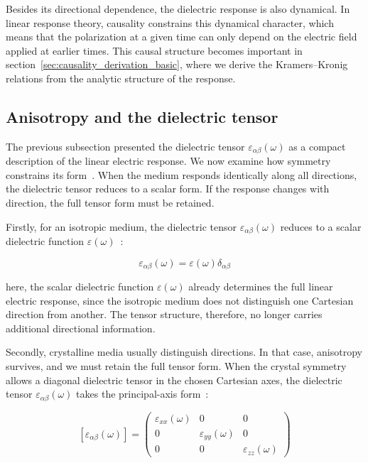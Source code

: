 Besides its directional dependence, the dielectric response is also dynamical.
In linear response theory, causality constrains this dynamical character,
which means that the polarization at a given time can only depend on the electric field applied at earlier times.
This causal structure becomes important in section~\ref{sec:causality_derivation_basic},
where we derive the Kramers--Kronig relations from the analytic structure of the response.

\subsection{Anisotropy and the dielectric tensor}

The previous subsection presented the dielectric tensor $\varepsilon_{\alpha\beta}(\omega)$ as a compact description of the linear electric response.
We now examine how symmetry constrains its form~\cite{capper2019optical}.
When the medium responds identically along all directions, the dielectric tensor reduces to a scalar form.
If the response changes with direction, the full tensor form must be retained.

Firstly, for an isotropic medium,
the dielectric tensor $\varepsilon_{\alpha\beta}(\omega)$ reduces to a scalar dielectric function $\varepsilon(\omega)$~\cite{born2013principles}:

\begin{equation}
    \varepsilon_{\alpha\beta}(\omega)
    = \varepsilon(\omega)\delta_{\alpha\beta}
\label{isotropic_dielectric_tensor}
\end{equation}

here, the scalar dielectric function $\varepsilon(\omega)$ already determines the full linear electric response,
since the isotropic medium does not distinguish one Cartesian direction from another.
The tensor structure, therefore, no longer carries additional directional information.

Secondly, crystalline media usually distinguish directions.
In that case, anisotropy survives, and we must retain the full tensor form.
When the crystal symmetry allows a diagonal dielectric tensor in the chosen Cartesian axes,
the dielectric tensor $\varepsilon_{\alpha\beta}(\omega)$ takes the principal-axis form~\cite{nye1985physical}:

\begin{equation}
    \left[\varepsilon_{\alpha\beta}(\omega)\right] = \begin{pmatrix}
        \varepsilon_{xx}(\omega) & 0 & 0 \\
        0 & \varepsilon_{yy}(\omega) & 0 \\
        0 & 0 & \varepsilon_{zz}(\omega)
    \end{pmatrix}
\label{principal_axis_dielectric_tensor}
\end{equation}

